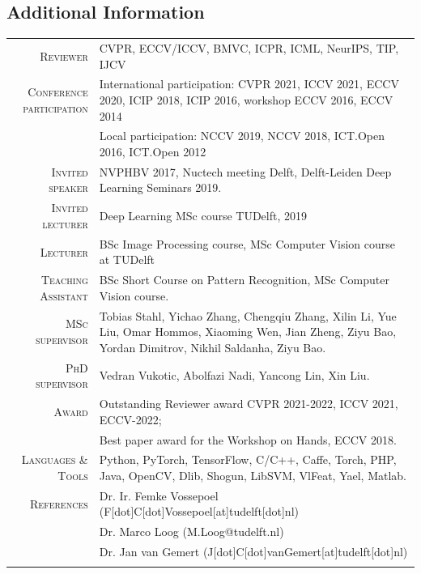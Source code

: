 \documentclass[a4paper, oneside, final]{scrartcl}
\begin{document}
\begin{center}
		\section{Additional Information}
		\begin{tabular}{r@{\hskip 0.3in}p{11.3cm}}
            \textsc{Reviewer}                   & CVPR, ECCV/ICCV, BMVC, ICPR, ICML, NeurIPS, TIP, IJCV\\
            \textsc{Conference participation}   & International participation: CVPR 2021, ICCV 2021, ECCV 2020, ICIP 2018, ICIP 2016, workshop ECCV 2016, ECCV 2014\\
                                                & Local participation: NCCV 2019, NCCV 2018, ICT.Open 2016, ICT.Open 2012\\
            \textsc{Invited speaker}            & NVPHBV 2017, Nuctech meeting Delft, Delft-Leiden Deep Learning Seminars 2019.\\
            \textsc{Invited lecturer}           & Deep Learning MSc course TUDelft, 2019\\
			\textsc{Lecturer}		            & BSc Image Processing course, MSc Computer Vision course at TUDelft\\
            \textsc{Teaching Assistant}         & BSc Short Course on Pattern Recognition, MSc Computer Vision course.\\ 
			\textsc{MSc supervisor}             & Tobias Stahl, Yichao Zhang, Chengqiu Zhang, Xilin Li, Yue Liu, Omar Hommos, Xiaoming Wen, Jian Zheng, Ziyu Bao, Yordan Dimitrov, Nikhil Saldanha, Ziyu Bao.\\
			\textsc{PhD supervisor}             & Vedran Vukotic, Abolfazi Nadi, Yancong Lin, Xin Liu.\\ 
            \textsc{Award}                      & Outstanding Reviewer award CVPR 2021-2022, ICCV 2021, ECCV-2022;\\ 
                                                & Best paper award for the Workshop on Hands, ECCV 2018.\\  
			\textsc{Languages \& Tools}         & Python, PyTorch, TensorFlow, C\slash C++, Caffe, Torch, PHP, 
                                                Java, OpenCV, Dlib, Shogun, LibSVM, VlFeat, Yael, Matlab.\\
			\textsc{References} & Dr. Ir. Femke Vossepoel (F[dot]C[dot]Vossepoel[at]tudelft[dot]nl)\\
                                & Dr. Marco Loog (M.Loog@tudelft.nl)\\
                                & Dr. Jan van Gemert (J[dot]C[dot]vanGemert[at]tudelft[dot]nl)\\
			\multicolumn{2}{c}{}\\
		\end{tabular}
	\end{center}
\end{document}
